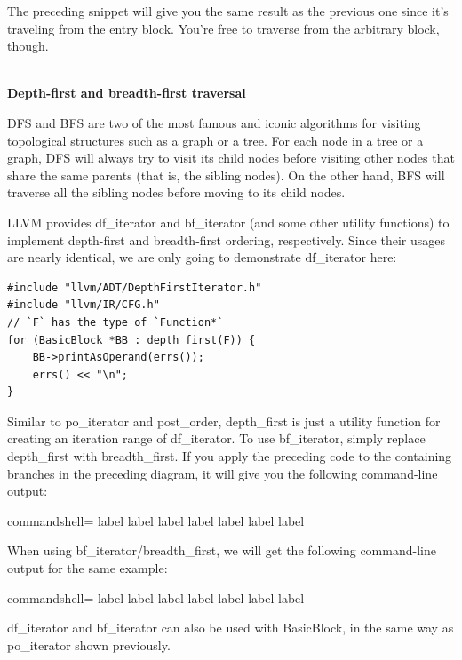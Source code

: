 The preceding snippet will give you the same result as the previous one since it's traveling from the entry block. You're free to traverse from the arbitrary block, though.

\hspace*{\fill} \\ %
\noindent
\textbf{Depth-first and breadth-first traversal}

DFS and BFS are two of the most famous and iconic algorithms for visiting topological structures such as a graph or a tree. For each node in a tree or a graph, DFS will always try to visit its child nodes before visiting other nodes that share the same parents (that is, the sibling nodes). On the other hand, BFS will traverse all the sibling nodes before moving to its child nodes.

LLVM provides df\_iterator and bf\_iterator (and some other utility functions) to implement depth-first and breadth-first ordering, respectively. Since their usages are nearly identical, we are only going to demonstrate df\_iterator here:

\begin{lstlisting}[style=styleCXX]
#include "llvm/ADT/DepthFirstIterator.h"
#include "llvm/IR/CFG.h"
// `F` has the type of `Function*`
for (BasicBlock *BB : depth_first(F)) {
	BB->printAsOperand(errs());
	errs() << "\n";
}
\end{lstlisting}

Similar to po\_iterator and post\_order, depth\_first is just a utility function for creating an iteration range of df\_iterator. To use bf\_iterator, simply replace depth\_first with breadth\_first. If you apply the preceding code to the containing branches in the preceding diagram, it will give you the following command-line output:

\begin{tcblisting}{commandshell={}}
label %
label %
label %
label %
label %
label %
label %
\end{tcblisting}

When using bf\_iterator/breadth\_first, we will get the following command-line output for the same example:

\begin{tcblisting}{commandshell={}}
label %
label %
label %
label %
label %
label %
label %
\end{tcblisting}

df\_iterator and bf\_iterator can also be used with BasicBlock, in the same way as po\_iterator shown previously.

